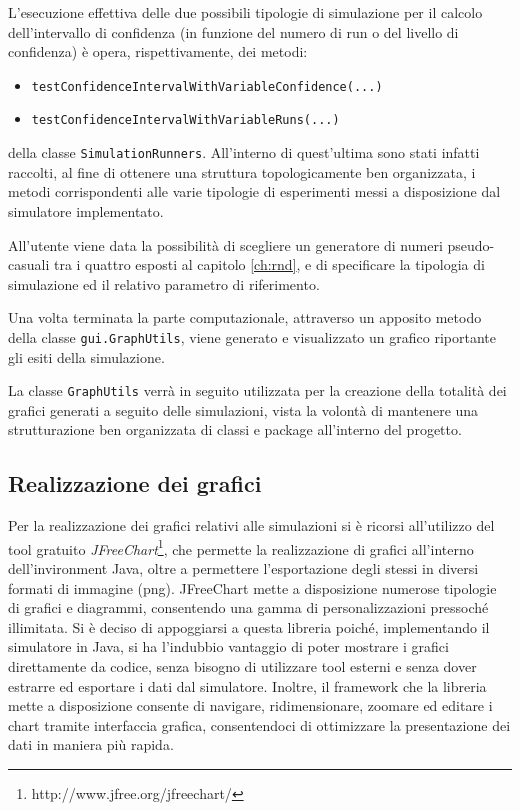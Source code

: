 L'esecuzione effettiva delle due possibili tipologie di simulazione per il calcolo dell'intervallo di confidenza (in funzione del numero di run o del livello di confidenza) \`e opera, rispettivamente,  dei metodi:
\begin{itemize}
\item {\tt testConfidenceIntervalWithVariableConfidence(...)} 
\item {\tt testConfidenceIntervalWithVariableRuns(...)}
\end{itemize} 

della classe {\tt SimulationRunners}. All'interno di quest'ultima sono stati infatti raccolti, al fine di ottenere una struttura topologicamente ben organizzata,  i metodi corrispondenti alle varie tipologie di esperimenti messi a disposizione dal simulatore implementato.

All'utente viene data la possibilit\`a di scegliere un generatore di numeri pseudo-casuali tra i quattro esposti al capitolo \ref{ch:rnd}, e di specificare la tipologia di simulazione ed il relativo parametro di riferimento. 

Una volta terminata la parte computazionale, attraverso un apposito metodo della classe {\tt gui.GraphUtils}, viene generato e visualizzato un grafico riportante gli esiti della simulazione.

La classe {\tt GraphUtils} verr\`a in seguito utilizzata per la creazione della totalit\`a dei grafici generati a seguito delle simulazioni, vista la volont\`a di mantenere una strutturazione ben organizzata di classi e package all'interno del progetto.

\subsection{Realizzazione dei grafici}
Per la realizzazione dei grafici relativi alle simulazioni si \`e ricorsi all'utilizzo del tool gratuito \emph{JFreeChart}\footnote{http://www.jfree.org/jfreechart/}, che permette la realizzazione di grafici all'interno dell'invironment Java, oltre a permettere l'esportazione degli stessi in diversi formati di immagine (png).
JFreeChart mette a disposizione numerose tipologie di grafici e diagrammi, consentendo una gamma di personalizzazioni pressoch\'e illimitata.
Si \`e deciso di appoggiarsi a questa libreria poich\'e, implementando il simulatore in Java, si ha l'indubbio vantaggio di poter mostrare i grafici direttamente da codice, senza bisogno di utilizzare tool esterni e senza dover estrarre ed esportare i dati dal simulatore. Inoltre, il framework che la libreria mette a disposizione consente di navigare, ridimensionare, zoomare ed editare i chart tramite interfaccia grafica, consentendoci di ottimizzare la presentazione dei dati in maniera pi\`u rapida.

